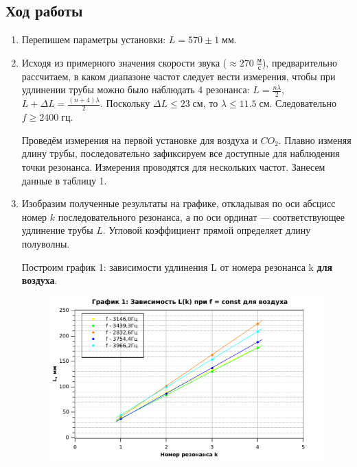 \documentclass[11pt,a4paper,oneside]{article}
\begin{document}
	\subsection{Ход работы}
	\begin{enumerate}
		\item Перепишем параметры установки:
		$L = 570\pm1 \; {мм}.$
		\item  
		
		Исходя из примерного значения скорости звука ($ \approx 270 \; \frac{м}{с}$), предварительно рассчитаем, в каком диапазоне частот следует вести измерения, чтобы при удлинении трубы можно было наблюдать 4 резонанса:
		$L = \frac{n\lambda}{2}$, $L + \Delta L = \frac{(n+4)\lambda}{2}$. Поскольку $\Delta L \leq 23 \; {см}$, то $\lambda \leq 11.5 \; {см}$. Следовательно $f \geq 2400 \; {гц}. $
		
		Проведём измерения на первой установке для воздуха и $CO_2$.
		Плавно изменяя длину трубы, последовательно зафиксируем все доступные для наблюдения точки резонанса. Измерения проводятся для нескольких частот.
		Занесем данные в таблицу 1.

\item Изобразим полученные результаты на графике, откладывая по оси абсцисс номер $k$ последовательного резонанса, а по оси ординат — соответствующее удлинение трубы
$L$. Угловой коэффициент прямой определяет длину полуволны.
		
Построим график 1: зависимости удлинения L от номера резонанса k \textbf{для воздуха}.

\begin{figure}[h!]
    \centering
	\includegraphics[scale=0.8]{Graph1.pdf}
	

\end{figure}
\end{enumerate}
\end{document}
